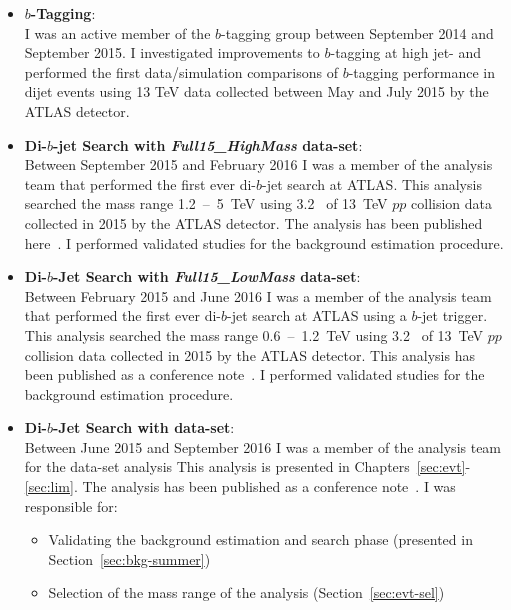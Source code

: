 \begin{itemize}[leftmargin=*]
\item\textbf{$b$-Tagging}:\\
  I was an active member of the $b$-tagging group between September 2014 and September 2015.
  I investigated improvements to $b$-tagging at high jet-\pT{} and
  performed the first data/simulation comparisons of $b$-tagging performance in dijet events using 13 TeV data collected between May and July 2015 by the ATLAS detector. \vspace{1em}
\item\textbf{Di-$b$-jet Search with \textit{Full15\_HighMass} data-set}:\\
  Between September 2015 and February 2016 I was a member of the analysis team that performed the first ever di-$b$-jet search at ATLAS.
  This analysis searched the mass range 1.2~--~5~TeV using 3.2~\ifb{} of 13~TeV $pp$ collision data collected in 2015 by the ATLAS detector.
  The analysis has been published here~\cite{dibjet-mori16_paper}. 
  I performed validated studies for the background estimation procedure. \vspace{1em}
\item\textbf{Di-$b$-Jet Search  with \textit{Full15\_LowMass} data-set}:\\
  Between February 2015 and June 2016 I was a member of the analysis team that performed the first ever di-$b$-jet search at ATLAS using a $b$-jet trigger.
  This analysis searched the mass range 0.6~--~1.2~TeV using 3.2~\ifb{} of 13~TeV $pp$ collision data collected in 2015 by the ATLAS detector.
  This analysis has been published as a conference note~\cite{dibjet-lhcp_conf}.
  I performed validated studies for the background estimation procedure. \vspace{1em}
    \newpage
\item\textbf{Di-$b$-Jet Search  with \summer{} data-set}:\\ 
  Between June 2015 and September 2016 I was a member of the analysis team for the \summer{} data-set analysis
  This analysis is presented in Chapters~\ref{sec:evt}-\ref{sec:lim}.
  The analysis has been published as a conference note~\cite{dibjet-ichep_conf}. 
  I was responsible for:
  \begin{itemize}
    \item Validating the background estimation and search phase (presented in Section~\ref{sec:bkg-summer})
    \item Selection of the mass range of the analysis (Section~\ref{sec:evt-sel})

\end{itemize}
\end{itemize}
